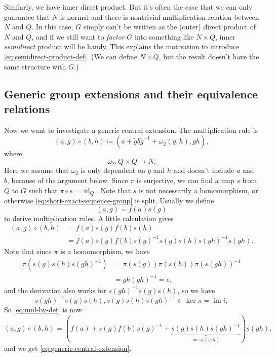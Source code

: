 \documentclass[hyperref, a4paper]{article}
\DeclareMathOperator{\id}{id}
\DeclareMathOperator{\im}{im}
\begin{document}
Similarly, we have inner direct product. But it's often the case that we can only guarantee that $N$ is normal 
and there is nontrivial multiplication relation between $N$ and $Q$. In this case, $G$ simply can't be 
written as the (outer) direct product of $N$ and $Q$, and if we still want to \emph{factor} $G$ into 
something like $N \times Q$, inner \emph{semidirect} product will be handy. This explains the motivation
to introduce \eqref{eq:semidirect-product-def}. (We can define $N \times Q$, but the result doesn't have 
the same structure with $G$.)

\subsection{Generic group extensions and their equivalence relations}

Now we want to investigate a generic central extension. The multiplication rule is 
\begin{equation}
    (a, g) \circ (b, h) \coloneqq (a + \tilde{g} b \tilde{g}^{-1} + \omega_2(g, h), gh),
    \label{eq:generic-central-extension}
\end{equation}
where
\begin{equation}
    \omega_2 : Q \times Q \to N.
\end{equation}
Here we assume that $\omega_2$ is only dependent on $g$ and $h$ and doesn't include $a$ and $b$, 
because of the argument below. Since $\pi$ is surjective, we can find a map $s$ from $Q$ to $G$ such that 
$\pi \circ s = \id_Q$. Note that $s$ is not necessarily a homomorphism, or otherwise 
\eqref{eq:short-exact-sequence-group} is split. %
Usually we define 
\begin{equation}
    (a, g) = f(a) s(g)
    \label{eq:pair-element-def}
\end{equation}
to derive multiplication rules. A little calculation gives
\begin{equation}
    \begin{aligned}
        (a, g) \circ (b, h) &= f(a) s(g) f(b) s(h) \\
        &= f(a) s(g) f(b) s(g)^{-1} s(g) s(h) s(gh)^{-1} s(gh).
    \end{aligned}
    \label{eq:mul-by-def}
\end{equation}
Note that since $\pi$ is a homomorphism, we have 
\[
    \begin{aligned}
        \pi (s(g) s(h) s(gh)^{-1}) &= \pi(s(g)) \pi(s(h)) \pi(s(gh))^{-1} \\
        &= g h (gh)^{-1} = e,
    \end{aligned}
\]
and the derivation also works for $s(gh)^{-1} s(g) s(h)$, so we have 
\begin{equation}
    s(gh)^{-1} s(g) s(h), s(g) s(h) s(gh)^{-1} \in \ker \pi = \im i,
    \label{eq:s-inv-pi-return-n}
\end{equation}
So \eqref{eq:mul-by-def} is now 
\[
    (a, g) \circ (b, h) = (f(a) + s(g) f(b) s(g)^{-1} + \underbrace{s(g) s(h) s(gh)^{-1}}_{\coloneqq \omega_2(g,h)}) s(gh),
\]
and we get \eqref{eq:generic-central-extension}.
\end{document}
